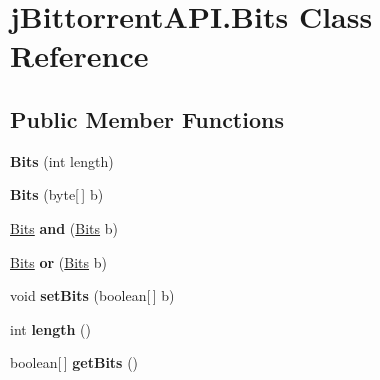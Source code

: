 \hypertarget{classj_bittorrent_a_p_i_1_1_bits}{
\section{jBittorrentAPI.Bits Class Reference}
\label{classj_bittorrent_a_p_i_1_1_bits}
}
\subsection*{Public Member Functions}
\begin{DoxyCompactItemize}
\item 
\hypertarget{classj_bittorrent_a_p_i_1_1_bits_a2d4210826e9b722fb66f3bcb48744741}{
{\bfseries Bits} (int length)}
\label{classj_bittorrent_a_p_i_1_1_bits_a2d4210826e9b722fb66f3bcb48744741}

\item 
\hypertarget{classj_bittorrent_a_p_i_1_1_bits_a5e0d4cbeaf094b747a11ed2c3feb41e3}{
{\bfseries Bits} (byte\mbox{[}$\,$\mbox{]} b)}
\label{classj_bittorrent_a_p_i_1_1_bits_a5e0d4cbeaf094b747a11ed2c3feb41e3}

\item 
\hypertarget{classj_bittorrent_a_p_i_1_1_bits_a47c0340d3cb4c78783069d3303adecba}{
\hyperlink{classj_bittorrent_a_p_i_1_1_bits}{Bits} {\bfseries and} (\hyperlink{classj_bittorrent_a_p_i_1_1_bits}{Bits} b)}
\label{classj_bittorrent_a_p_i_1_1_bits_a47c0340d3cb4c78783069d3303adecba}

\item 
\hypertarget{classj_bittorrent_a_p_i_1_1_bits_a7c9ddeedbe2e897885c6287b796c2c1f}{
\hyperlink{classj_bittorrent_a_p_i_1_1_bits}{Bits} {\bfseries or} (\hyperlink{classj_bittorrent_a_p_i_1_1_bits}{Bits} b)}
\label{classj_bittorrent_a_p_i_1_1_bits_a7c9ddeedbe2e897885c6287b796c2c1f}

\item 
\hypertarget{classj_bittorrent_a_p_i_1_1_bits_a58b3cd7996e1e1c619cce3ff2cea70be}{
void {\bfseries setBits} (boolean\mbox{[}$\,$\mbox{]} b)}
\label{classj_bittorrent_a_p_i_1_1_bits_a58b3cd7996e1e1c619cce3ff2cea70be}

\item 
\hypertarget{classj_bittorrent_a_p_i_1_1_bits_a0de716d8423b1183e349231f2ee4f89b}{
int {\bfseries length} ()}
\label{classj_bittorrent_a_p_i_1_1_bits_a0de716d8423b1183e349231f2ee4f89b}

\item 
\hypertarget{classj_bittorrent_a_p_i_1_1_bits_af1d50e3be4fed36cadf60540bf028206}{
boolean\mbox{[}$\,$\mbox{]} {\bfseries getBits} ()}
\label{classj_bittorrent_a_p_i_1_1_bits_af1d50e3be4fed36cadf60540bf028206}


\end{DoxyCompactItemize}
